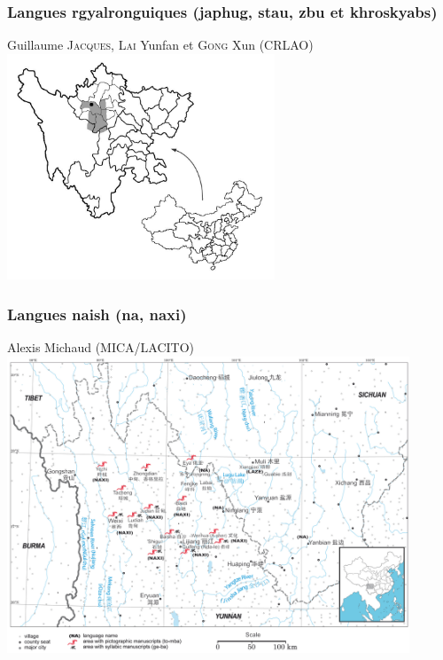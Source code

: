 \documentclass[xcolor=table]{beamer}
\begin{document}
  \begin{frame} 
 \frametitle{Langues rgyalronguiques (japhug, stau, zbu et khroskyabs)}
  Guillaume \textsc{Jacques}, \textsc{Lai} Yunfan et \textsc{Gong} Xun (CRLAO)
 \includegraphics[width=0.6\textwidth]{carte.JPG} \centering
 
  \end{frame}  
 
  \begin{frame} 
 \frametitle{Langues naish (na, naxi)}
 
 Alexis Michaud (MICA/LACITO)
  \includegraphics[width=0.9\textwidth]{naish.jpg} \centering
 
  \end{frame}   
 
\end{document}
